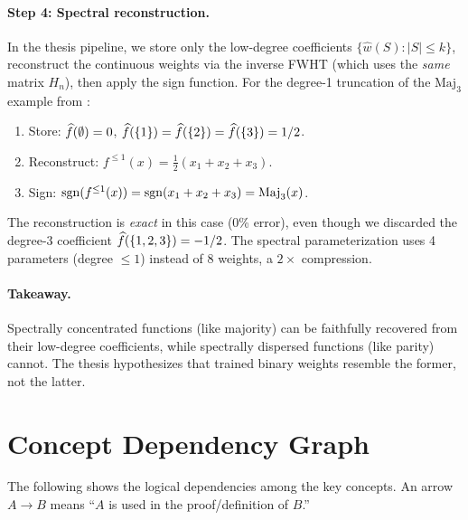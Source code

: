 \paragraph{Step 4: Spectral reconstruction.}
In the thesis pipeline, we store only the low-degree coefficients
$\{\widehat{w}(S) : |S| \leq k\}$, reconstruct the continuous weights
via the inverse FWHT (which uses the \emph{same} matrix $H_n$), then
apply the sign function. For the degree-1 truncation of the $\text{Maj}_3$
example from :
\begin{enumerate}
  \item Store: $\widehat{f}(\emptyset) = 0$, $\widehat{f}(\{1\}) = \widehat{f}(\{2\}) = \widehat{f}(\{3\}) = 1/2$.
  \item Reconstruct: $f^{\leq 1}(x) = \frac{1}{2}(x_1 + x_2 + x_3)$.
  \item Sign: $\operatorname{sgn}(f^{\leq 1}(x)) = \operatorname{sgn}(x_1 + x_2 + x_3) = \text{Maj}_3(x)$.
\end{enumerate}
The reconstruction is \emph{exact} in this case (0\% error), even though
we discarded the degree-3 coefficient $\widehat{f}(\{1,2,3\}) = -1/2$.
The spectral parameterization uses 4 parameters (degree $\leq 1$)
instead of 8 weights, a $2\times$ compression.

\paragraph{Takeaway.}
Spectrally concentrated functions (like majority) can be faithfully
recovered from their low-degree coefficients, while spectrally dispersed
functions (like parity) cannot. The thesis hypothesizes that trained
binary weights resemble the former, not the latter.


\section{Concept Dependency Graph}\label{sec:dependency}

The following shows the logical dependencies among the key concepts.
An arrow $A \to B$ means ``$A$ is used in the proof/definition of $B$.''

